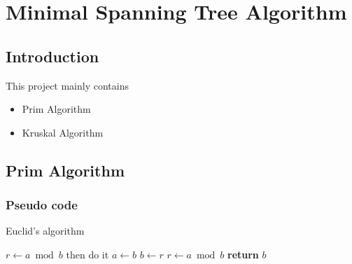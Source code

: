 \documentclass[cs4size, punct, nospace, fancyhdr, fntef]{ctexart}
\begin{document}
  \section{Minimal Spanning Tree Algorithm}

  \subsection{Introduction}
    This project mainly contains
    \begin{itemize}
      \item Prim Algorithm
      \item Kruskal Algorithm
    \end{itemize}
  \subsection{Prim Algorithm}
    \subsubsection{Pseudo code}
      \begin{algorithm}
      \caption{Euclid's algorithm}\label{euclid}
      \begin{algorithmic}[1]
        \State $r\gets a\bmod b$
          \State then do it
        \EndIf
          \State $a\gets b$
          \State $b\gets r$
          \State $r\gets a\bmod b$
        \EndWhile\label{euclidendwhile}
        \State \textbf{return} $b$
      \EndFunction
      \end{algorithmic}
      \end{algorithm}
\end{document}

